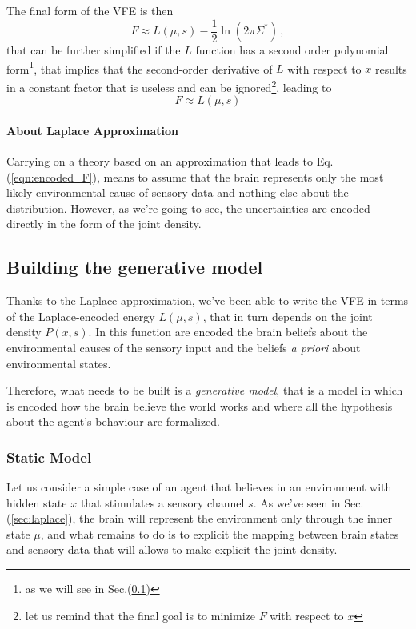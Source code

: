 \documentclass[a4paper, 10pt]{article}
\begin{document}
The final form of the VFE is then
\begin{equation}
F \approx L(\mu,s) - \frac{1}{2} \ln \left( 2 \pi \Sigma^{\ast} \right) \, ,
\end{equation}
that can be further simplified if the $L$ function has a second order polynomial form\footnote{as we will see in Sec.(\ref{sec:G})}, that implies that the second-order derivative of $L$ with respect to $x$ results in a constant factor that is useless and can be ignored\footnote{ let us remind that the final goal is to minimize $F$ with respect to $x$}, leading to 
\begin{equation}
F \approx L(\mu,s)
\label{eqn:encoded_F}
\end{equation}


\paragraph{About Laplace Approximation}
Carrying on a theory based on an approximation that leads to Eq.(\ref{eqn:encoded_F}), means to assume that the brain represents only the most likely environmental cause of sensory data and nothing else about the distribution. However, as we're going to see, the uncertainties are encoded directly in the form of the joint density.



\subsection{Building the generative model}
\label{sec:G}
Thanks to the Laplace approximation, we've been able to write the VFE in terms of the Laplace-encoded energy $L(\mu,s)$, that in turn depends on the joint density $P(x, s)$. In this function are encoded the brain beliefs about the environmental causes of the sensory input and the beliefs \emph{a priori} about environmental states.

Therefore, what needs to be built is a \emph{generative model}, that is a model in which is encoded how the brain believe the world works and where all the hypothesis about the agent's behaviour are formalized.

\subsubsection{Static Model}

Let us consider a simple case of an agent that believes in an environment with hidden state $ x$ that stimulates a sensory channel $ s$. As we've seen in Sec.(\ref{sec:laplace}), the brain will represent the environment only through the inner state $\mu$, and what remains to do is to explicit the mapping between brain states and sensory data that will allows to make explicit the joint density.
\end{document}
